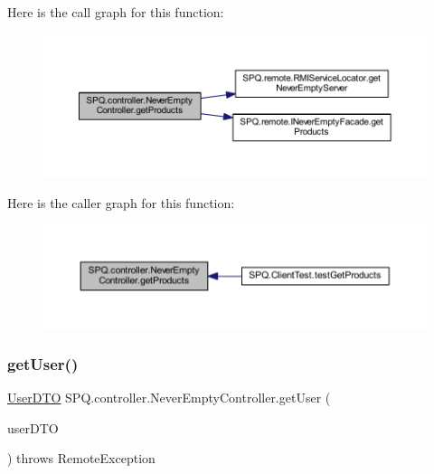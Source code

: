 Here is the call graph for this function\+:\nopagebreak
\begin{figure}[H]
\begin{center}
\leavevmode
\includegraphics[width=350pt]{class_s_p_q_1_1controller_1_1_never_empty_controller_ace99d4d39979b72d620871475a4817f9_cgraph}
\end{center}
\end{figure}
Here is the caller graph for this function\+:\nopagebreak
\begin{figure}[H]
\begin{center}
\leavevmode
\includegraphics[width=350pt]{class_s_p_q_1_1controller_1_1_never_empty_controller_ace99d4d39979b72d620871475a4817f9_icgraph}
\end{center}
\end{figure}
\mbox{\label{class_s_p_q_1_1controller_1_1_never_empty_controller_a4f799c7fc9ce32740ec45401fa6fd1b1}} 
\subsubsection{\texorpdfstring{get\+User()}{getUser()}}
{\footnotesize\ttfamily \mbox{\hyperlink{class_s_p_q_1_1dto_1_1_user_d_t_o}{User\+D\+TO}} S\+P\+Q.\+controller.\+Never\+Empty\+Controller.\+get\+User (\begin{DoxyParamCaption}\item[{\mbox{\hyperlink{class_s_p_q_1_1dto_1_1_user_d_t_o}{User\+D\+TO}}}]{user\+D\+TO }\end{DoxyParamCaption}) throws Remote\+Exception}

